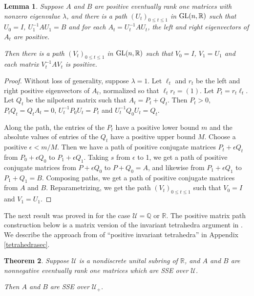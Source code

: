 \documentclass{amsart}
\newtheorem{theorem}{Theorem}[section]
\newtheorem{lemma}[theorem]{Lemma}
\theoremstyle{definition}
\theoremstyle{remark}
\numberwithin{equation}{section}
\begin{document}
{{\begin{lemma}\label{positivepath}
Suppose $A$ and $B$ are positive eventually rank one 
 matrices with  nonzero eigenvalue  
$\lambda $, and there is a path 
$(U_t)_{0\leq t\leq 1}$ in 
$\textnormal{GL}(n,\mathbb R)$ such that 
$U_0=I$, $U_1^{-1}AU_1=B$ and 
for each $A_t=U_t^{-1}AU_t$, the 
left and right eigenvectors of $A_t$ are positive. 

Then there is a path 
$(V_t)_{0\leq t\leq 1}$ in 
$\textnormal{GL}(n,\mathbb R)$ such that $V_0=I$,  $V_1=U_1$ and each 
matrix $V_t^{-1}AV_t$ is positive. 
\end{lemma} 

\begin{proof} Without loss of generality, suppose $\lambda =1 $. 
Let $\ell_t$ and $r_t$ be the left and right
positive  eigenvectors of $A_t$, 
normalized so that $\ell_t r_t= (1)$. Let $P_t=r_t\ell_t$. 
Let $Q_t$ be the nilpotent matrix such that $A_t=P_t+Q_t$. 
Then $P_t>0$, $P_tQ_t=Q_tA_t=0$, 
$U_t^{-1}P_0U_t=P_t$ and 
$U_t^{-1}Q_0U_t=Q_t$. 

Along the path, the entries of the $P_t$ 
have a positive lower bound $m$ and the absolute values of 
entries of the  $Q_t$ have a positive upper bound $M$. 
Choose a positive $\epsilon < m/M$. Then we have a path 
of positive conjugate matrices 
$P_t+ \epsilon Q_t$  from $P_0+\epsilon Q_0$ to 
$P_1 + \epsilon Q_1$. 
Taking $s$ from $\epsilon $ to 1, 
we get a path of positive conjugate matrices from $P+\epsilon Q_0$ to 
$P+Q_0=A$, and likewise from 
$P_1+\epsilon Q_1$ to 
$P_1+Q_1=B$. Composing paths, we get  a path of positive 
conjugate matrices from $A$ and $B$. Reparametrizing, we get 
the path $(V_t)_{0\leq t\leq 1}$ such that $V_0=I$ 
and $V_1=U_1$. 
\end{proof} 

The next result was proved in \cite{KR2} for 
the case $\mathcal U= \mathbb Q$ or $\mathbb R$. 
The positive matrix path construction below 
is a  matrix version of the 
invariant tetrahedra argument in \cite{KR2}. 
We describe the approach from \cite{KR2} of ``positive invariant 
tetrahedra'' in Appendix 
\ref{tetrahedrasec}.

\begin{theorem}\label{oneeigenvalue} 
Suppose $\mathcal U$ is a nondiscrete unital 
subring of $\mathbb R$, and $A$ and $B$ are nonnegative 
eventually rank one matrices
 which are SSE over 
 $\mathcal U$. 

 Then $A$ and $B$ are SSE over $\mathcal U_+$. 
\end{theorem} 

}}
\end{document}
